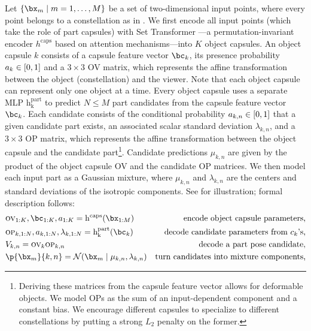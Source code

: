 Let $\set{\bx_m\mid m=1,\dots,M}$ be a set of two-dimensional input points, where every point belongs to a constellation as in .
We first encode all input points (which take the role of part capsules) with Set Transformer \citep{Lee2019set}---a permutation-invariant encoder $h^\mathrm{caps}$ based on attention mechanisms---into $K$ object capsules.
An object capsule $k$ consists of a capsule feature vector $\bc_k$, its presence probability $a_k \in {\left[0, 1\right]}$ and a $3 \times 3$ \gls{OV} matrix, which represents the affine transformation between the object (constellation) and the viewer.
Note that each object capsule can represent only one object at a time.
Every object capsule uses a separate \gls{MLP} $\operatorname{h_k^\mathrm{part}}$ to predict $N \leq M$ part candidates from the capsule feature vector $\bc_k$.
Each candidate consists of the conditional probability $a_{k,n} \in {\left[0, 1\right]}$ that a given candidate part exists, an associated scalar standard deviation $\lambda_{k,n}$, and a $3 \times 3$ \gls{OP} matrix, which represents the affine transformation between the object capsule and the candidate part\footnote{Deriving these matrices from the capsule feature vector allows for deformable objects. We model \gls{OP}s as the sum of an input-dependent component and a constant bias. We encourage different capsules to specialize to different constellations by putting a strong $L_2$ penalty on the former.}.
Candidate predictions $\mu_{k,n}$ are given by the product of the object capsule \gls{OV} and the candidate \gls{OP} matrices.
We then model each input part as a Gaussian mixture, where $\mu_{k,n}$ and $\lambda_{k,n}$ are the centers and standard deviations of the isotropic components.
See  for illustration; formal description follows:
\begin{align}
    &\textsc{ov}_{1:K}, \bc_{1:K}, a_{1:K} = \operatorname{h^\mathrm{caps}} (\bx_{1:M}) &\text{encode object capsule parameters,}\\
    &\textsc{op}_{k,1:N}, a_{k, 1:N}, \lambda_{k, 1:N} = \operatorname{h_k^\mathrm{part}} (\bc_k) &\text{decode candidate parameters from $c_k$'s,}\\
    &V_{k,n} = \textsc{ov}_k \textsc{op}_{k,n} &\text{decode a part pose candidate,}\\
    &\p{\bx_m}{k,n} = \gauss{\bx_m \mid \mu_{k,n}, \lambda_{k,n}} &\text{turn candidates into mixture components,}\label{eq:component}
\end{align}
